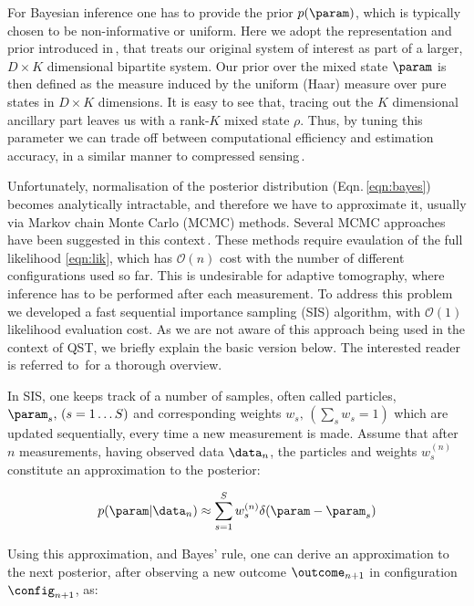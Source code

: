For Bayesian inference one has to provide the prior $p(\param)$, which is typically chosen to be non-informative or uniform. Here we adopt the representation and prior introduced in\,\cite{BayesianTomography}, that treats our original system of interest as part of a larger, $D\times K$ dimensional bipartite system. Our prior over the mixed state $\param$ is then defined as the measure induced by the uniform (Haar) measure over pure states in $D\times K$ dimensions. It is easy to see that, tracing out the $K$ dimensional ancillary part leaves us with a rank-$K$ mixed state $\rho$. Thus, by tuning this parameter we can trade off between computational efficiency and estimation accuracy, in a similar manner to compressed sensing\,\cite{CompressedSensing}.

Unfortunately, normalisation of the posterior distribution (Eqn.\,\eqref{eqn:bayes}) becomes analytically intractable, and therefore we have to approximate it, usually via Markov chain Monte Carlo (MCMC) methods. Several MCMC approaches have been suggested in this context\,\cite[][and refs.\ therein]{BayesianTomography}. These methods require evaulation of the full likelihood \eqref{eqn:lik}, which has $\mathcal{O}(n)$ cost with the number of different configurations used so far. This is undesirable for adaptive tomography, where inference has to be performed after each measurement. To address this problem we developed a fast sequential importance sampling (SIS) algorithm, with $\mathcal{O}(1)$ likelihood evaluation cost. As we are not aware of this approach being used in the context of QST, we briefly explain the basic version below. The interested reader is referred to\,\cite{SMCBook} for a thorough overview.

In SIS, one keeps track of a number of samples, often called particles, $\param_s,\, (s=1\ldots S)$ and corresponding weights $w_s, \, \left( \sum_s w_s = 1 \right)$  which are updated sequentially, every time a new measurement is made. Assume that after $n$ measurements, having observed data $\data_n$, the particles and weights  $w^{(n)}_s$ constitute an approximation to the posterior:

\begin{equation}
	p(\param\vert\data_n)\approx \sum_{s=1}^{S}w^{(n)}_s\delta(\param-\param_s)\label{eqn:SISapprox}
\end{equation}

Using this approximation, and Bayes' rule, one can derive an approximation to the next posterior, after observing a new outcome $\outcome_{n+1}$ in configuration $\config_{n+1}$, as:

